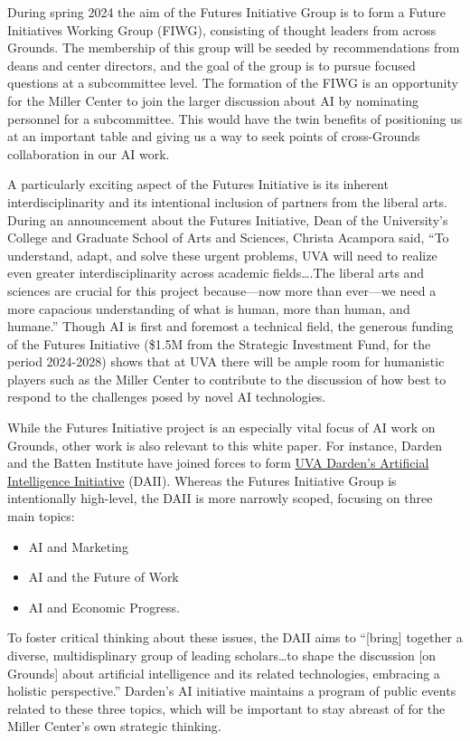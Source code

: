\documentclass[12pt, oneside]{article}   	%
\begin{document}
During spring 2024 the aim of the Futures Initiative Group is to form a Future Initiatives Working Group (FIWG), consisting of thought leaders from across Grounds.  The membership of this group will be seeded by recommendations from deans and center directors, and the goal of the group is to pursue focused questions at a subcommittee level.  The formation of the FIWG is an opportunity for the Miller Center to join the larger discussion about AI by nominating personnel for a subcommittee.  This would have the twin benefits of positioning us at an important table and giving us a way to seek points of cross-Grounds collaboration in our AI work.

A particularly exciting aspect of the Futures Initiative is its inherent interdisciplinarity and its intentional inclusion of partners from the liberal arts.  During an announcement about the Futures Initiative, Dean of the University’s College and Graduate School of Arts and Sciences, Christa Acampora said, “To understand, adapt, and solve these urgent problems, UVA will need to realize even greater interdisciplinarity across academic fields….The liberal arts and sciences are crucial for this project because—now more than ever—we need a more capacious understanding of what is human, more than human, and humane.”  Though AI is first and foremost a technical field, the generous funding of the Futures Initiative (\$1.5M from the Strategic Investment Fund, for the period 2024-2028) shows that at UVA there will be ample room for humanistic players such as the Miller Center to contribute to the discussion of how best to respond to the challenges posed by novel AI technologies.

While the Futures Initiative project is an especially vital focus of AI work on Grounds, other work is also relevant to this white paper.  For instance, Darden and the Batten Institute have joined forces to form \href{https://www.darden.virginia.edu/intelligence}{UVA Darden’s Artificial Intelligence Initiative} (DAII).  Whereas the Futures Initiative Group is intentionally high-level, the DAII is more narrowly scoped, focusing on three main topics:
\begin{itemize}
\item AI and Marketing
\item AI and the Future of Work
\item AI and Economic Progress.
\end{itemize}
To foster critical thinking about these issues, the DAII aims to “[bring] together a diverse, multidisplinary group of leading scholars…to shape the discussion [on Grounds] about artificial intelligence and its related technologies, embracing a holistic perspective.”  Darden’s AI initiative maintains a program of public events related to these three topics, which will be important to stay abreast of for the Miller Center’s own strategic thinking.
\end{document}
